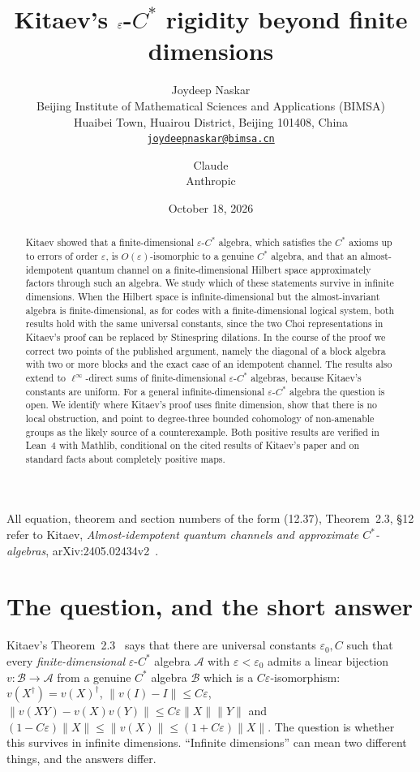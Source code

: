 \documentclass[11pt]{article}
\title{Kitaev's $\eps$-$C^*$ rigidity beyond finite dimensions}
\author{Joydeep Naskar\\[2pt]
{\small Beijing Institute of Mathematical Sciences and Applications (BIMSA)}\\
{\small Huaibei Town, Huairou District, Beijing 101408, China}\\
{\small\href{mailto:joydeepnaskar@bimsa.cn}{\texttt{joydeepnaskar@bimsa.cn}}}
\and
Claude\\[2pt]
{\small Anthropic}}
\date{October 18, 2026}
\theoremstyle{remark}
\newcommand{\eps}{\varepsilon}
\newcommand{\cA}{\mathcal{A}}
\newcommand{\cB}{\mathcal{B}}
\begin{document}
\maketitle

\begin{abstract}
Kitaev showed that a finite-dimensional $\eps$-$C^*$ algebra, which satisfies the $C^*$ axioms up to errors of order $\eps$, is $O(\eps)$-isomorphic to a genuine $C^*$ algebra, and that an almost-idempotent quantum channel on a finite-dimensional Hilbert space approximately factors through such an algebra. We study which of these statements survive in infinite dimensions. When the Hilbert space is infinite-dimensional but the almost-invariant algebra is finite-dimensional, as for codes with a finite-dimensional logical system, both results hold with the same universal constants, since the two Choi representations in Kitaev's proof can be replaced by Stinespring dilations. In the course of the proof we correct two points of the published argument, namely the diagonal of a block algebra with two or more blocks and the exact case of an idempotent channel. The results also extend to $\ell^\infty$-direct sums of finite-dimensional $\eps$-$C^*$ algebras, because Kitaev's constants are uniform. For a general infinite-dimensional $\eps$-$C^*$ algebra the question is open. We identify where Kitaev's proof uses finite dimension, show that there is no local obstruction, and point to degree-three bounded cohomology of non-amenable groups as the likely source of a counterexample. Both positive results are verified in Lean~4 with Mathlib, conditional on the cited results of Kitaev's paper and on standard facts about completely positive maps.
\end{abstract}

\noindent
All equation, theorem and section numbers of the form (12.37), Theorem~2.3, \S12 refer to Kitaev, \emph{Almost-idempotent quantum channels and approximate $C^*$-algebras}, arXiv:2405.02434v2~\cite{Kitaev}.

\section{The question, and the short answer}

Kitaev's Theorem~2.3~\cite{Kitaev} says that there are universal constants $\eps_0, C$ such that every \emph{finite-dimensional} $\eps$-$C^*$ algebra $\cA$ with $\eps<\eps_0$ admits a linear bijection $v\colon\cB\to\cA$ from a genuine $C^*$ algebra $\cB$ which is a $C\eps$-isomorphism: $v(X^\dagger)=v(X)^\dagger$, $\|v(I)-I\|\le C\eps$, $\|v(XY)-v(X)v(Y)\|\le C\eps\|X\|\|Y\|$ and $(1-C\eps)\|X\|\le\|v(X)\|\le(1+C\eps)\|X\|$. The question is whether this survives in infinite dimensions. ``Infinite dimensions'' can mean two different things, and the answers differ.
\end{document}
